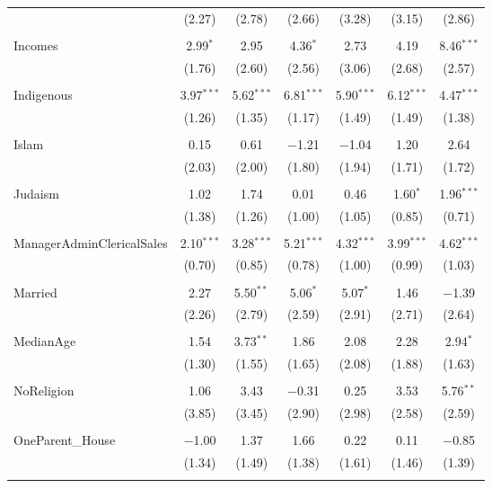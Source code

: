 \documentclass[openany]{book}
\begin{document}
\begin{table}[!htbp]
\begin{tabular}{@{\extracolsep{1pt}}lcccccc}
  & (2.27) & (2.78) & (2.66) & (3.28) & (3.15) & (2.86) \\ 
  & & & & & & \\ 
 Incomes & 2.99$^{*}$ & 2.95 & 4.36$^{*}$ & 2.73 & 4.19 & 8.46$^{***}$ \\ 
  & (1.76) & (2.60) & (2.56) & (3.06) & (2.68) & (2.57) \\ 
  & & & & & & \\ 
 Indigenous & 3.97$^{***}$ & 5.62$^{***}$ & 6.81$^{***}$ & 5.90$^{***}$ & 6.12$^{***}$ & 4.47$^{***}$ \\ 
  & (1.26) & (1.35) & (1.17) & (1.49) & (1.49) & (1.38) \\ 
  & & & & & & \\ 
 Islam & 0.15 & 0.61 & $-$1.21 & $-$1.04 & 1.20 & 2.64 \\ 
  & (2.03) & (2.00) & (1.80) & (1.94) & (1.71) & (1.72) \\ 
  & & & & & & \\ 
 Judaism & 1.02 & 1.74 & 0.01 & 0.46 & 1.60$^{*}$ & 1.96$^{***}$ \\ 
  & (1.38) & (1.26) & (1.00) & (1.05) & (0.85) & (0.71) \\ 
  & & & & & & \\ 
 ManagerAdminClericalSales & 2.10$^{***}$ & 3.28$^{***}$ & 5.21$^{***}$ & 4.32$^{***}$ & 3.99$^{***}$ & 4.62$^{***}$ \\ 
  & (0.70) & (0.85) & (0.78) & (1.00) & (0.99) & (1.03) \\ 
  & & & & & & \\ 
 Married & 2.27 & 5.50$^{**}$ & 5.06$^{*}$ & 5.07$^{*}$ & 1.46 & $-$1.39 \\ 
  & (2.26) & (2.79) & (2.59) & (2.91) & (2.71) & (2.64) \\ 
  & & & & & & \\ 
 MedianAge & 1.54 & 3.73$^{**}$ & 1.86 & 2.08 & 2.28 & 2.94$^{*}$ \\ 
  & (1.30) & (1.55) & (1.65) & (2.08) & (1.88) & (1.63) \\ 
  & & & & & & \\ 
 NoReligion & 1.06 & 3.43 & $-$0.31 & 0.25 & 3.53 & 5.76$^{**}$ \\ 
  & (3.85) & (3.45) & (2.90) & (2.98) & (2.58) & (2.59) \\ 
  & & & & & & \\ 
 OneParent\_House & $-$1.00 & 1.37 & 1.66 & 0.22 & 0.11 & $-$0.85 \\ 
  & (1.34) & (1.49) & (1.38) & (1.61) & (1.46) & (1.39) \\ 
  & & & & & & \\ 

\end{tabular}
\end{table}
\end{document}
